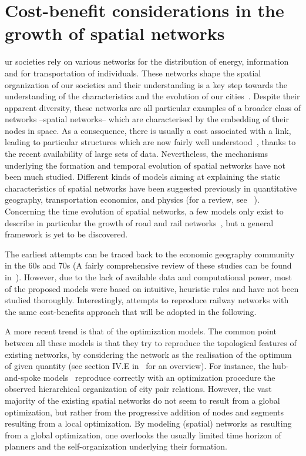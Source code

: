 \chapter{Cost-benefit considerations in the growth of spatial networks}
\label{chap:cost-benefit}


ur societies rely on various networks for the distribution of energy,
information and for transportation of individuals. These networks shape the
spatial organization of our societies and their understanding is a key step
towards the understanding of the characteristics and the evolution of our
cities~\cite{Batty:2005}. Despite their apparent diversity, these networks are
all particular examples of a broader class of networks --spatial networks--
which are characterised by the embedding of their nodes in space. As a
consequence, there is usually a cost associated with a link, leading to
particular structures which are now fairly well
understood~\cite{Barthelemy:2011}, thanks to the recent availability of large
sets of data. Nevertheless, the mechanisms underlying the formation and temporal
evolution of spatial networks have not been much studied. Different kinds of
models aiming at explaining the static characteristics of spatial networks have
been suggested previously in quantitative geography, transportation economics,
and physics (for a review, see ~\cite{Levinson:2009}). Concerning the time
evolution of spatial networks, a few models only exist to describe in particular
the growth of road and rail networks~\cite{Levinson:2006, Gastner:2006,
Barthelemy:2008, Courtat:2011}, but a general framework is yet to be discovered.

The earliest attempts can be traced back to the economic geography community in the 60s and 70s (A fairly comprehensive review of these studies can be found in~\cite{Haggett:1969}). However, due to the lack of available data and computational power, most of the proposed models were based on intuitive, heuristic rules and have not been studied thoroughly. Interestingly, \cite{Black:1971} attempts to reproduce railway networks with the same cost-benefits approach that will be adopted in the following.

A more recent trend is that of the optimization models. The common point between all these models is that they try to reproduce the topological features of existing networks, by considering the network as the realisation of the optimum of given quantity (see section IV.E in~\cite{Barthelemy:2011} for an overview). For instance, the hub-and-spoke models~\cite{OKelly:1998} reproduce correctly with an optimization procedure the observed hierarchical organization of city pair relations. However, the vast majority of the existing spatial networks do not seem to result from a global optimization, but rather from the progressive addition of nodes and segments resulting from a local optimization. By modeling (spatial) networks as resulting from a global optimization, one overlooks the usually limited time horizon of planners and the self-organization underlying their formation.

